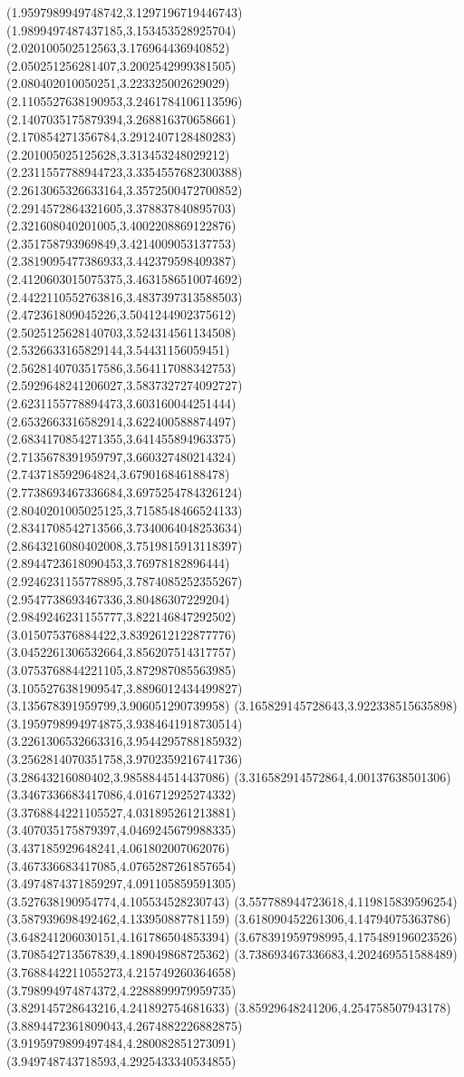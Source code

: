 {(1.9597989949748742,3.1297196719446743)
(1.9899497487437185,3.153453528925704)
(2.020100502512563,3.176964436940852)
(2.050251256281407,3.2002542999381505)
(2.080402010050251,3.223325002629029)
(2.1105527638190953,3.2461784106113596)
(2.1407035175879394,3.268816370658661)
(2.170854271356784,3.2912407128480283)
(2.201005025125628,3.313453248029212)
(2.2311557788944723,3.3354557682300388)
(2.2613065326633164,3.3572500472700852)
(2.2914572864321605,3.378837840895703)
(2.321608040201005,3.4002208869122876)
(2.351758793969849,3.4214009053137753)
(2.3819095477386933,3.442379598409387)
(2.4120603015075375,3.4631586510074692)
(2.4422110552763816,3.4837397313588503)
(2.472361809045226,3.5041244902375612)
(2.5025125628140703,3.524314561134508)
(2.5326633165829144,3.54431156059451)
(2.5628140703517586,3.564117088342753)
(2.5929648241206027,3.5837327274092727)
(2.6231155778894473,3.603160044251444)
(2.6532663316582914,3.622400588874497)
(2.6834170854271355,3.641455894963375)
(2.7135678391959797,3.660327480214324)
(2.743718592964824,3.679016846188478)
(2.7738693467336684,3.6975254784326124)
(2.8040201005025125,3.7158548466524133)
(2.8341708542713566,3.7340064048253634)
(2.8643216080402008,3.7519815913118397)
(2.8944723618090453,3.76978182896444)
(2.9246231155778895,3.7874085252355267)
(2.9547738693467336,3.80486307229204)
(2.9849246231155777,3.822146847292502)
(3.015075376884422,3.8392612122877776)
(3.0452261306532664,3.856207514317757)
(3.0753768844221105,3.872987085563985)
(3.1055276381909547,3.8896012434499827)
(3.135678391959799,3.906051290739958)
(3.165829145728643,3.922338515635898)
(3.1959798994974875,3.9384641918730514)
(3.2261306532663316,3.9544295788185932)
(3.2562814070351758,3.9702359216741736)
(3.28643216080402,3.9858844514437086)
(3.316582914572864,4.00137638501306)
(3.3467336683417086,4.016712925274332)
(3.3768844221105527,4.031895261213881)
(3.407035175879397,4.0469245679988335)
(3.437185929648241,4.061802007062076)
(3.467336683417085,4.0765287261857654)
(3.4974874371859297,4.091105859591305)
(3.527638190954774,4.105534528230743)
(3.557788944723618,4.119815839596254)
(3.587939698492462,4.133950887781159)
(3.618090452261306,4.14794075363786)
(3.648241206030151,4.161786504853394)
(3.678391959798995,4.175489196023526)
(3.708542713567839,4.189049868725362)
(3.738693467336683,4.202469551588489)
(3.7688442211055273,4.215749260364658)
(3.798994974874372,4.2288899979959735)
(3.829145728643216,4.241892754681633)
(3.85929648241206,4.254758507943178)
(3.8894472361809043,4.2674882226882875)
(3.9195979899497484,4.280082851273091)
(3.949748743718593,4.2925433340534855)
}
